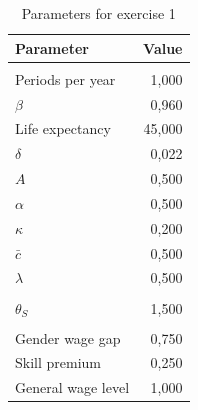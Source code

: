 \documentclass[12pt]{article}
\begin{document}
\begin{table}[htbp]
	\centering
	\caption{Parameters for exercise 1}
	\begin{tabular}{lr}
		\toprule
		Parameter & \multicolumn{1}{l}{Value} \\
		\midrule
		&  \\
		Periods per year & 1,000 \\
		$\beta$ & 0,960 \\
		Life expectancy & 45,000 \\
		$\delta$ & 0,022 \\
		$A$ & 0,500 \\
		$\alpha$ & 0,500 \\
		$\kappa$ & 0,200 \\
		$\bar {c}$ & 0,500 \\
		$\lambda$ & 0,500 \\
		&  \\
		$\theta_S$ & 1,500 \\
		&  \\
		Gender wage gap & 0,750 \\
		Skill premium & 0,250 \\
		General wage level & 1,000 \\
		\bottomrule
	\end{tabular}
\end{table}
\end{document}
